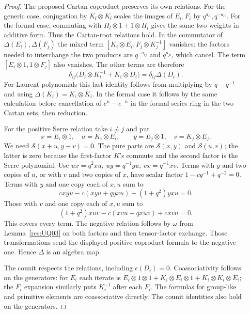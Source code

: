 \begin{proof}
The proposed Cartan coproduct preserves its own relations.
For the generic case, conjugation by \(K_l\otimes K_l\)
scales the images of \(E_i,F_i\) by \(q^{a_{li}},q^{-a_{li}}\).
For the formal case, commuting with \(H_l\otimes1+1\otimes H_l\)
gives the same two weights in additive form. Thus the
Cartan-root relations hold. In the commutator of
\(\Delta(E_i),\Delta(F_j)\) the mixed term
\([K_i\otimes E_i,F_j\otimes K_j^{-1}]\) vanishes:
the factors needed to interchange the two products
are \(q^{-a_{ij}}\) and \(q^{a_{ji}}\), which cancel.
The term \([E_i\otimes1,1\otimes F_j]\) also vanishes.
The other terms are therefore
\[
 \delta_{ij}\bigl(D_i\otimes K_i^{-1}+K_i\otimes D_i\bigr)
       =\delta_{ij}\Delta(D_i).
\]
For Laurent polynomials this last identity follows from
multiplying by \(q-q^{-1}\) and using \(\Delta(K_i)=K_i\otimes K_i\).
In the formal case it follows by the same calculation
before cancellation of \(e^h-e^{-h}\) in the
formal series ring in the two Cartan sets, then reduction.

For the positive Serre relation take \(i\ne j\) and put
\[
 x=E_i\otimes1,\quad u=K_i\otimes E_i,\qquad
 y=E_j\otimes1,\quad v=K_j\otimes E_j.
\]
We need \(\mathcal S(x+u,y+v)=0\). The pure parts are
\(\mathcal S(x,y)\) and \(\mathcal S(u,v)\); the latter
is zero because the first-factor \(K\)'s commute and
the second factor is the Serre polynomial.
Use \(ux=q^2xu,\ uy=q^{-1}yu,\ vx=q^{-1}xv\).
Terms with \(y\) and two copies of \(u\), or with \(v\) and two
copies of \(x\), have scalar factor \(1-cq^{-1}+q^{-2}=0\).
Terms with \(y\) and one copy each of \(x,u\) sum to
\[
 cxyu-c(xyu+qyxu)+(1+q^2)yxu=0.
\]
Those with \(v\) and one copy each of \(x,u\) sum to
\[
 (1+q^2)xuv-c(xvu+qxuv)+cxvu=0 .
\]
This covers every term. The negative relation follows
by \(\omega\) from Lemma~\ref{res:UQ03} on both factors
and then tensor-factor exchange. Those transformations
send the displayed positive coproduct formula to the
negative one. Hence \(\Delta\) is an algebra map.

The counit respects the relations, including \(\epsilon(D_i)=0\).
Coassociativity follows on the generators: for \(E_i\) each
iterate is \(E_i\otimes1\otimes1+K_i\otimes E_i\otimes1+
K_i\otimes K_i\otimes E_i\); the \(F_i\) expansion similarly
puts \(K_i^{-1}\) after each \(F_i\). The formulas for group-like
and primitive elements are coassociative directly. The counit
identities also hold on the generators.


\end{proof}
